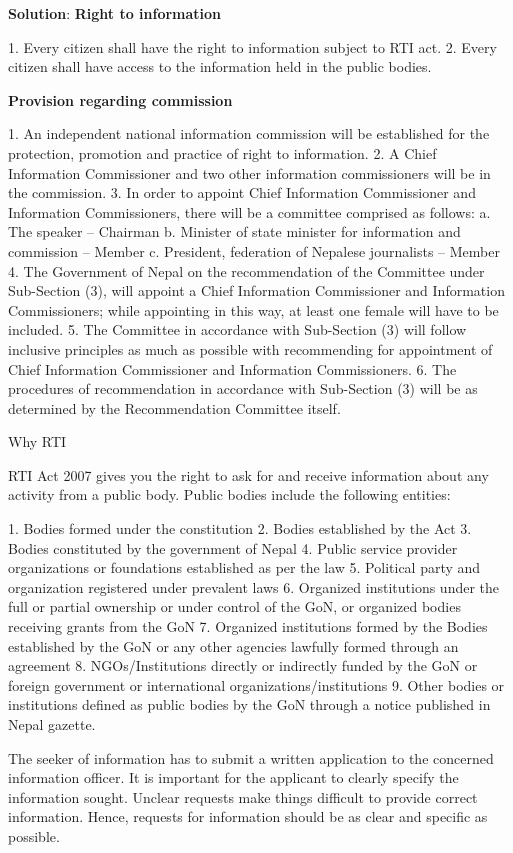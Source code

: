 \documentclass[
]{book}
\newenvironment{solution}{ {\bfseries Solution}:}{}
\begin{document}
\begin{questions}
\begin{solution}
\textbf{Right to information}

1. Every citizen shall have the right to information subject to RTI act.
2. Every citizen shall have access to the information held in the public bodies.

\textbf{Provision regarding commission}

1. An independent national information commission will be established for the protection, promotion and practice of right to information.
2. A Chief Information Commissioner and two other information commissioners will be in the commission.
3. In order to appoint Chief Information Commissioner and Information Commissioners, there will be a committee comprised as follows:
  a. The speaker -- Chairman
  b. Minister of state minister for information and commission -- Member
  c. President, federation of Nepalese journalists -- Member
4. The Government of Nepal on the recommendation of the Committee under Sub-Section (3), will appoint a Chief Information Commissioner and Information Commissioners; while appointing in this way, at least one female will have to be included.
5. The Committee in accordance with Sub-Section (3) will follow inclusive principles as much as possible with recommending for appointment of Chief Information Commissioner and Information Commissioners.
6. The procedures of recommendation in accordance with Sub-Section (3) will be as determined by the Recommendation Committee itself.

Why RTI

RTI Act 2007 gives you the right to ask for and receive information about any activity from a public body. Public bodies include the following entities:

1. Bodies formed under the constitution
2. Bodies established by the Act
3. Bodies constituted by the government of Nepal
4. Public service provider organizations or foundations established as per the law
5. Political party and organization registered under prevalent laws
6. Organized institutions under the full or partial ownership or under control of the GoN, or organized bodies receiving grants from the GoN
7. Organized institutions formed by the Bodies established by the GoN or any other agencies lawfully formed through an agreement
8. NGOs/Institutions directly or indirectly funded by the GoN or foreign government or international organizations/institutions
9. Other bodies or institutions defined as public bodies by the GoN through a notice published in Nepal gazette.

The seeker of information has to submit a written application to the concerned information officer. It is important for the applicant to clearly specify the information sought. Unclear requests make things difficult to provide correct information. Hence, requests for information should be as clear and specific as possible.


\end{solution}
\end{questions}
\end{document}
